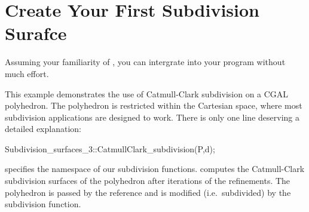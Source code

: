 




\section{Create Your First Subdivision Surafce}
\label{secFirstSub}
Assuming your familiarity of ,
you can intergrate  into your program 
without much effort.


This example demonstrates the use of Catmull-Clark subdivision
on a CGAL polyhedron. The polyhedron is restricted within the Cartesian
space, where most subdivision applications are designed to work.
There is only one line deserving a detailed explanation:
\begin{ccExampleCode}
Subdivision_surfaces_3::CatmullClark_subdivision(P,d);
\end{ccExampleCode}
 specifies the namespace of our
subdivision functions.  computes the 
Catmull-Clark subdivision surfaces of the polyhedron  after
 iterations of the refinements. The polyhedron  is 
passed by the reference and is modified (i.e.~subdivided) by the 
subdivision function.

